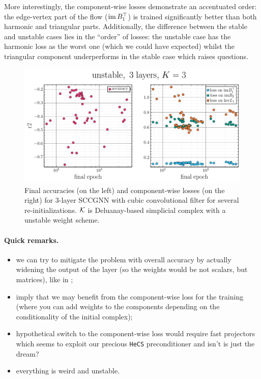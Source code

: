 \documentclass{mynotes}
\begin{document}
More interestingly, the component-wise losses demonstrate an accentuated order: the edge-vertex part of the flow (\( \operatorname{im} B_1^\top \)) is trained significantly better than both harmonic and triangular parts. Additionally, the difference between the stable and unstable cases lies in the ``order'' of losses: the unstable case has the harmonic loss as the worst one (which we could have expected) whilst the triangular component underperforms in the stable case which raises questions.
\begin{figure}[htbp]
      \vspace{-20pt}
      \centering
      \includegraphics*[width=0.9\columnwidth]{imgs/stop_time_unstable_clean2_r2.pdf}\vspace{-10pt}
      \caption{ 
            Final accuracies (on the left) and component-wise losses (on the right) for 3-layer SCCGNN with cubic convolutional filter for several re-initializations. \( \mathcal{K} \) is Deluanay-based simplicial complex with a unstable weight scheme.
      \label{fig:repeats_first_unstable}
      }
\end{figure}

\paragraph{ Quick remarks. }
\begin{itemize}
      \item we can try to mitigate the problem with overall accuracy by actually widening the output of the layer (so the weights would be not scalars, but matrices), like in \cite{ebliSimplicialNeuralNetworks2020};
      \item {} imply that we may benefit from the component-wise loss for the training (where you can add weights to the components depending on the conditionality of the initial complex);
      \item hypothetical switch to the component-wise loss would require fast projectors which seems to exploit our precious \texttt{HeCS} preconditioner and isn't is just the dream?
      \item everything is weird and unstable.
\end{itemize}
\end{document}
